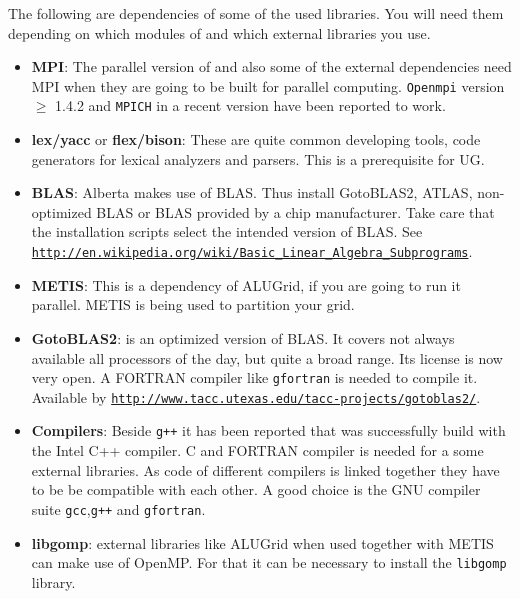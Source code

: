The following are dependencies of some of the used libraries. You will need them depending on which modules of \Dune and which external libraries you use.

\begin{itemize}
\item \textbf{MPI}: The parallel version of \Dune and also some of the external dependencies need MPI when they are going to be built for parallel computing. \texttt{Openmpi} version $\geqslant$ 1.4.2 and \texttt{MPICH} in a recent version have been reported to work. 

\item \textbf{lex/yacc} or \textbf{flex/bison}: These are quite common developing tools, code generators for lexical analyzers and parsers. This is a prerequisite for UG.

\item \textbf{BLAS}: Alberta makes use of BLAS. Thus install GotoBLAS2, ATLAS, non-optimized BLAS or BLAS provided by a chip manufacturer. Take care that the installation scripts select the intended version of BLAS. See \texttt{\url{http://en.wikipedia.org/wiki/Basic_Linear_Algebra_Subprograms}}.

\item \textbf{METIS}: This is a dependency of ALUGrid, if you are going to run it parallel. METIS is being used to partition your grid.

\item \textbf{GotoBLAS2}: is an optimized version of BLAS. It covers not always available all processors of the day, but quite a broad range. Its license is now very open.  A FORTRAN compiler like \texttt{gfortran} is needed to compile it.\\
Available by \texttt{\url{http://www.tacc.utexas.edu/tacc-projects/gotoblas2/}}.

\item \textbf{Compilers}: Beside \texttt{g++} it has been reported that \Dune was successfully build with the Intel C++ compiler. 
C and FORTRAN compiler is needed for a some external libraries. As code of different compilers is linked together they have to be be compatible with each other. A good choice is the GNU compiler suite \texttt{gcc},\texttt{g++} and \texttt{gfortran}.

\item \textbf{libgomp}: external libraries like ALUGrid when used together with METIS can make use of OpenMP. For that it can be necessary to install the \texttt{libgomp} library.

\end{itemize}

